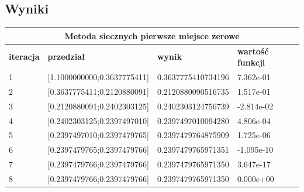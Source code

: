 \documentclass[a4paper, 11pt]{article}
\begin{document}
\subsection{Wyniki}

\begin{table}[H]
\centering
\label{my-label}
\begin{tabular}{llll}
\hline
\multicolumn{4}{c}{\textbf{Metoda siecznych pierwsze miejsce zerowe}} \\ \hline
\multicolumn{1}{|l|}{\textbf{iteracja}} & \multicolumn{1}{l|}{\textbf{przedział}} & \multicolumn{1}{l|}{\textbf{wynik}} & \multicolumn{1}{l|}{\textbf{wartość funkcji}} \\ \hline
\multicolumn{1}{|l|}{1} & \multicolumn{1}{l|}{{[}1.1000000000;0.3637775411{]}} & \multicolumn{1}{l|}{0.3637775410734196} & \multicolumn{1}{l|}{7.362e-01} \\ \hline
\multicolumn{1}{|l|}{2} & \multicolumn{1}{l|}{{[}0.3637775411;0.2120880091{]}} & \multicolumn{1}{l|}{0.2120880090516735} & \multicolumn{1}{l|}{1.517e-01} \\ \hline
\multicolumn{1}{|l|}{3} & \multicolumn{1}{l|}{{[}0.2120880091;0.2402303125{]}} & \multicolumn{1}{l|}{0.2402303124756739} & \multicolumn{1}{l|}{-2.814e-02} \\ \hline
\multicolumn{1}{|l|}{4} & \multicolumn{1}{l|}{{[}0.2402303125;0.2397497010{]}} & \multicolumn{1}{l|}{0.2397497010094280} & \multicolumn{1}{l|}{4.806e-04} \\ \hline
\multicolumn{1}{|l|}{5} & \multicolumn{1}{l|}{{[}0.2397497010;0.2397479765{]}} & \multicolumn{1}{l|}{0.2397479764875909} & \multicolumn{1}{l|}{1.725e-06} \\ \hline
\multicolumn{1}{|l|}{6} & \multicolumn{1}{l|}{{[}0.2397479765;0.2397479766{]}} & \multicolumn{1}{l|}{0.2397479765971351} & \multicolumn{1}{l|}{-1.095e-10} \\ \hline
\multicolumn{1}{|l|}{7} & \multicolumn{1}{l|}{{[}0.2397479766;0.2397479766{]}} & \multicolumn{1}{l|}{0.2397479765971350} & \multicolumn{1}{l|}{3.647e-17} \\ \hline
\multicolumn{1}{|l|}{8} & \multicolumn{1}{l|}{{[}0.2397479766;0.2397479766{]}} & \multicolumn{1}{l|}{0.2397479765971350} & \multicolumn{1}{l|}{0.000e+00} \\ \hline
\end{tabular}
\end{table}
\end{document}
